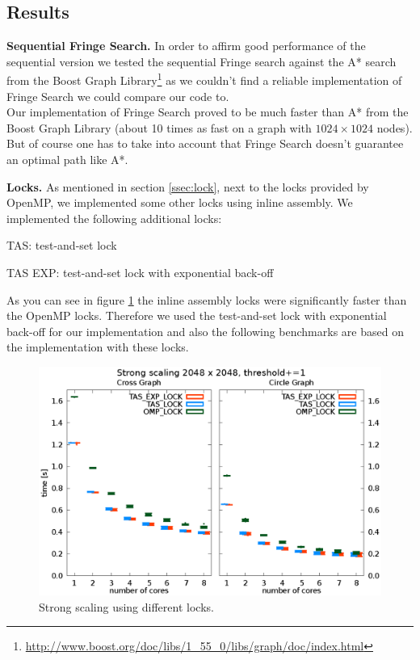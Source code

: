 \documentclass[letterpaper]{article}
\newcommand{\mypar}[1]{{\bf #1.}}
\begin{document}
\subsection{Results}\label{ssec:results}

\mypar{Sequential Fringe Search}
In order to affirm good performance of the sequential version we tested the sequential Fringe search against the A* search from the Boost Graph Library\footnote{\url{http://www.boost.org/doc/libs/1_55_0/libs/graph/doc/index.html}} as we couldn't find a reliable implementation of Fringe Search we could compare our code to.\\
Our implementation of Fringe Search proved to be much faster than A* from the Boost Graph Library (about 10 times as fast on a graph with $1024 \times 1024$ nodes). But of course one has to take into account that Fringe Search doesn't guarantee an optimal path like A*.

\mypar{Locks}
As mentioned in section \ref{ssec:lock}, next to the locks provided by OpenMP, we implemented some other locks using inline assembly. We implemented the following additional locks:
\begin{compactitem}
\item TAS: test-and-set lock
\item TAS EXP: test-and-set lock with exponential back-off
\end{compactitem}
As you can see in figure \ref{fig:lock_bench} the inline assembly locks were significantly faster than the OpenMP locks. Therefore we used the test-and-set lock with exponential back-off for our implementation and also the following benchmarks are based on the implementation with these locks.

\begin{figure}[h]\centering
  \includegraphics[scale=0.558]{lock_benchmark.eps}
  \caption{Strong scaling using different locks.\label{fig:lock_bench}}
\end{figure}
\end{document}
